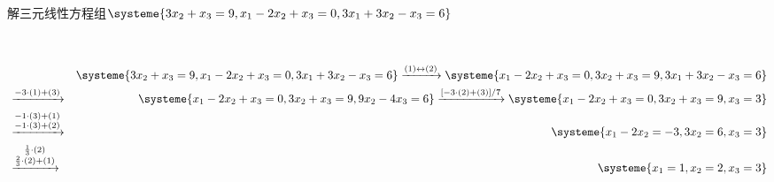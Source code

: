 \begin{eg}
解三元线性方程组$\systeme{3x_2 + x_3 = 9, x_1 - 2x_2 + x_3 = 0 , 3x_1 + 3x_2 - x_3 = 6}$
\end{eg}
\begin{solution}\

\begin{eqnarray*}
& & \systeme{3x_2 + x_3 = 9 , x_1 - 2x_2 + x_3 = 0 , 3x_1 + 3x_2 - x_3 = 6} \xrightarrow{(1)\leftrightarrow(2)} \systeme{x_1 - 2x_2 + x_3 = 0 , 3x_2 + x_3 = 9 , 3x_1 + 3x_2 - x_3 = 6} \\
& \xrightarrow{-3\cdot(1) + (3)} & \systeme{x_1 - 2x_2 + x_3 = 0, 3x_2 + x_3 = 9,  9x_2 - 4x_3 = 6} \xrightarrow{[-3\cdot(2)+(3)]/7} \systeme{x_1 - 2x_2 + x_3 = 0 , 3x_2 + x_3 = 9 , x_3 = 3} \\ & \xrightarrow{\substack{-1\cdot(3)+(1) \\ -1\cdot(3)+(2)}} & \systeme{x_1 - 2x_2 = -3 , 3x_2 = 6, x_3 = 3} \\
& \xrightarrow{\substack{\frac13\cdot(2) \\ \frac23\cdot(2)+(1)}} & \systeme{x_1 = 1, x_2 = 2, x_3 = 3}
\end{eqnarray*}
\end{solution}

\vspace{1.5em}


